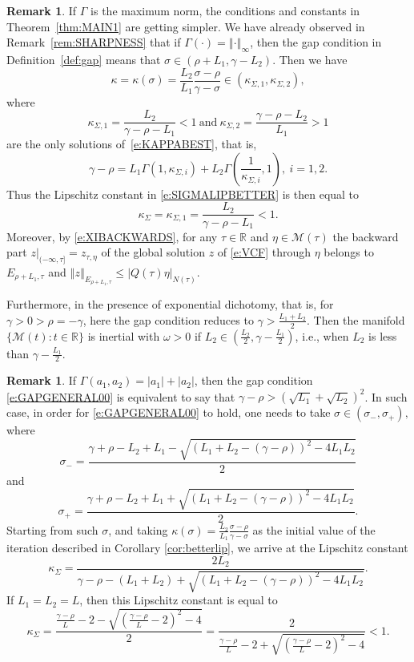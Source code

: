 \documentclass[a4paper,11pt,reqno]{amsart}
\theoremstyle{plain}
\theoremstyle{definition}
\newtheorem{rem}[lem]{Remark}
\numberwithin{equation}{section}
\newcommand{\R}{\mathbb{R}}
\newcommand{\calm}{\mathcal M}
\newcommand{\norm}[1]{\left\Vert#1\right\Vert}
\renewcommand{\leq}{\leqslant}
\begin{document}
\begin{rem}\label{rem:MAXIMUM}
If $\Gamma$ is the maximum norm, the conditions and constants in Theorem~\ref{thm:MAIN1} are getting simpler.
We have already observed in Remark~\ref{rem:SHARPNESS} that if $\Gamma(\cdot)=\norm{\cdot}_\infty$, then the gap condition in Definition~\ref{def:gap} means that $\sigma\in(\rho+L_1,\gamma-L_2)$. Then we have $$\kappa=\kappa(\sigma)=\frac{L_2}{L_1}\frac{\sigma-\rho}{\gamma-\sigma}\in(\kappa_{\Sigma,1},\kappa_{\Sigma,2}),$$
where 
$$\kappa_{\Sigma,1}=\frac{L_2}{\gamma-\rho-L_1}<1\ \text{and}\ \kappa_{\Sigma,2}=\frac{\gamma-\rho-L_2}{L_1}>1$$
are the only solutions of~\eqref{e:KAPPABEST}, that is,
\begin{equation*}
\gamma-\rho=L_1\Gamma(1,\kappa_{\Sigma,i})+L_2\Gamma\left(\frac{1}{\kappa_{\Sigma,i}},1\right),\ i=1,2.
\end{equation*}
Thus the Lipschitz constant in \eqref{e:SIGMALIPBETTER} is then equal to 
$$\kappa_\Sigma=\kappa_{\Sigma,1}=\frac{L_2}{\gamma-\rho-L_1}<1.$$
Moreover, by \eqref{e:XIBACKWARDS}, for any $\tau\in\R$ and ${\eta}\in\calm(\tau)$ the backward part ${z}|_{(-\infty,\tau]}=z_{\tau,{\eta}}$ of the {global solution $z$ of \eqref{e:VCF}} through $\eta$ belongs to $E_{\rho+L_1,\tau}$ and {$\norm{z}_{E_{\rho+L_1,\tau}}\leq|Q(\tau)\eta|_{N(\tau)}$.}

Furthermore, in the presence of exponential dichotomy, that is, for $\gamma>0>\rho=-\gamma$, here the gap condition reduces  to $\gamma>\frac{L_1+L_2}{2}$. Then the manifold $\{\calm(t)\colon t\in\R\}$ is inertial with $\omega>0$ if $L_2\in\left(\frac{L_2}{2},\gamma-\frac{L_1}{2}\right)$, i.e., when $L_2$ is less than $\gamma-\frac{L_1}{2}$. 
\end{rem}

\begin{rem}
	If $\Gamma(a_1,a_2) = |a_1|+|a_2|$, then  the gap condition \eqref{e:GAPGENERAL00} is equivalent to say that $\gamma-\rho > (\sqrt{L_1}+\sqrt{L_2})^2$. In such case, in order for  \eqref{e:GAPGENERAL00} to hold, one needs to take
	$
	\sigma\in (\sigma_-,\sigma_+),$ where $$\sigma_- =  \frac{\gamma+\rho-L_2+L_1 - \sqrt{(L_1+L_2-(\gamma-\rho))^2-4L_1L_2}}{2}$$ and $$\sigma_+=\frac{\gamma+\rho-L_2+L_1 + \sqrt{(L_1+L_2-(\gamma-\rho))^2-4L_1L_2}}{2}.
	$$
	Starting from such $\sigma$, and taking $\kappa(\sigma) = \frac{L_2}{L_1}\frac{\sigma-\rho}{\gamma-\sigma}$ as the initial value of the iteration described in Corollary \ref{cor:betterlip}, we arrive at the Lipschitz constant
	 $$
	 \kappa_\Sigma = \frac{2L_2}{\gamma-\rho-(L_1+L_2)+\sqrt{(L_1+L_2-(\gamma-\rho))^2-4L_1L_2}}.
	 $$
	 If $L_1=L_2=L$, then this Lipschitz constant is equal to
	 $$
	 \kappa_\Sigma = \frac{\frac{\gamma-\rho}{L}-2-\sqrt{\left(\frac{\gamma-\rho}{L}-2\right)^2-4}}{2} = \frac{2}{\frac{\gamma-\rho}{L}-2+\sqrt{\left(\frac{\gamma-\rho}{L}-2\right)^2-4}}<1.
	 $$ 
	\end{rem}
\end{document}
